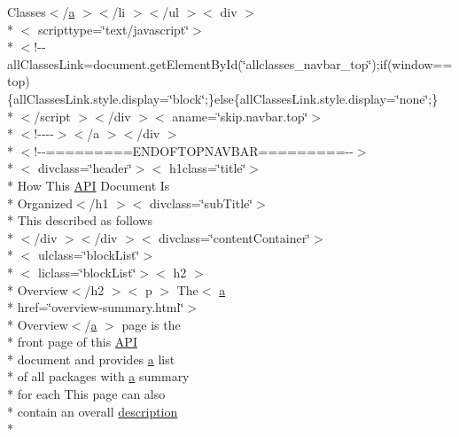 \begin{DoxyCompactItemize}
\item 
Classes$<$/\hyperlink{style_8css_a5e8981582017bb8b84c21f148345d1f7}{a} $>$$<$/li $>$$<$/ul $>$$<$ div $>$\\*
$<$ scripttype=\char`\"{}text/javascript\char`\"{}$>$\\*
$<$!-\/-\/all\-Classes\-Link=document.\-get\-Element\-By\-Id(\char`\"{}allclasses\-\_\-navbar\-\_\-top\char`\"{});if(window==top)\{all\-Classes\-Link.\-style.\-display=\char`\"{}block\char`\"{};\}else\{all\-Classes\-Link.\-style.\-display=\char`\"{}none\char`\"{};\}\\*
$<$/script $>$$<$/div $>$$<$ aname=\char`\"{}skip.\-navbar.\-top\char`\"{}$>$\\*
$<$!-\/-\/-\/-\/$>$$<$/a $>$$<$/div $>$\\*
$<$!-\/-\/=========E\-N\-D\-O\-F\-T\-O\-P\-N\-A\-V\-B\-A\-R=========-\/-\/$>$\\*
$<$ divclass=\char`\"{}header\char`\"{}$>$$<$ h1class=\char`\"{}title\char`\"{}$>$\\*
 How This \hyperlink{help-doc_8html_a7d3f9452f8a4b1b494eade1a77016691}{A\-P\-I} Document Is \\*
Organized$<$/h1 $>$$<$ divclass=\char`\"{}sub\-Title\char`\"{}$>$\\*
 This described as follows\\*
$<$/div $>$$<$/div $>$$<$ divclass=\char`\"{}content\-Container\char`\"{}$>$\\*
$<$ ulclass=\char`\"{}block\-List\char`\"{}$>$\\*
$<$ liclass=\char`\"{}block\-List\char`\"{}$>$$<$ h2 $>$\\*
 Overview$<$/h2 $>$$<$ p $>$ The$<$ \hyperlink{style_8css_a5e8981582017bb8b84c21f148345d1f7}{a} \\*
href=\char`\"{}overview-\/summary.\-html\char`\"{}$>$\\*
 Overview$<$/\hyperlink{style_8css_a5e8981582017bb8b84c21f148345d1f7}{a} $>$ page is the \\*
front page of this \hyperlink{help-doc_8html_a7d3f9452f8a4b1b494eade1a77016691}{A\-P\-I} \\*
document and provides \hyperlink{style_8css_a5e8981582017bb8b84c21f148345d1f7}{a} list \\*
of all packages with \hyperlink{style_8css_a5e8981582017bb8b84c21f148345d1f7}{a} summary \\*
for each This page can also \\*
contain an overall \hyperlink{_cloudia_d_b_8html_a2661f439a4a94ffdcd5e47ae1da0bb1d}{description} \\*
$$
\end{DoxyCompactItemize}
